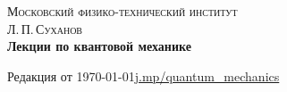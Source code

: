 \frontmatter

\begin{titlepage}
\center

\textsc{\large Московский физико-технический институт}\\[1cm]
\textsc{\Large Л.\,П.\,Суханов}\\[6cm]

{ \Huge \bfseries Лекции по квантовой механике}\\[0.4cm]

\vfill

Редакция от \today \hfill \href{https://github.com/mkuznets/quantum-mechanics-lectures}{j.mp/quantum\_mechanics}

\end{titlepage}

\clearpage\thispagestyle{empty}

\tableofcontents

%
%
